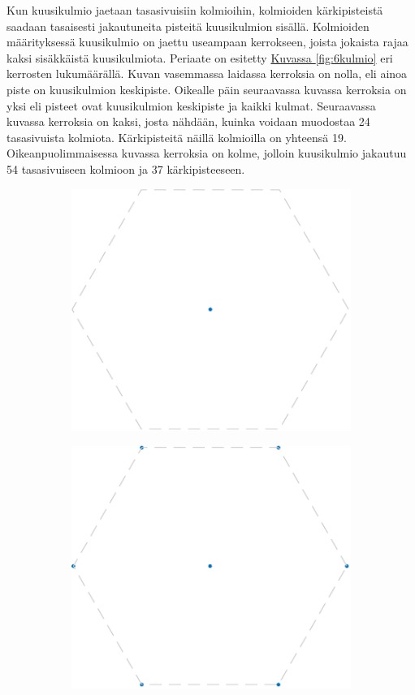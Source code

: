 Kun kuusikulmio jaetaan tasasivuisiin kolmioihin, kolmioiden kärkipisteistä saadaan tasaisesti jakautuneita pisteitä kuusikulmion sisällä. Kolmioiden määrityksessä kuusikulmio on jaettu useampaan kerrokseen, joista jokaista rajaa kaksi sisäkkäistä kuusikulmiota. Periaate on esitetty \hyperref[fig:6kulmio]{Kuvassa \ref*{fig:6kulmio}} eri kerrosten lukumäärällä. Kuvan vasemmassa laidassa kerroksia on nolla, eli ainoa piste on kuusikulmion keskipiste. Oikealle päin seuraavassa kuvassa kerroksia on yksi eli pisteet ovat kuusikulmion keskipiste ja kaikki kulmat. Seuraavassa kuvassa kerroksia on kaksi, josta nähdään, kuinka voidaan muodostaa 24 tasasivuista kolmiota. Kärkipisteitä näillä kolmioilla on yhteensä 19. Oikeanpuolimmaisessa kuvassa kerroksia on kolme, jolloin kuusikulmio jakautuu 54 tasasivuiseen kolmioon ja 37 kärkipisteeseen.
\begin{figure}[H]
    \centering
    \captionsetup{width=.9\textwidth}
    \begin{subfigure}[t]{.225\textwidth}
        \includegraphics[width=.9\linewidth]{kuvat/6kulmio0.pdf}
        \caption{}
    \end{subfigure}%
    \begin{subfigure}[t]{.225\textwidth}
        \includegraphics[width=.9\linewidth]{kuvat/6kulmio1.pdf}

\end{subfigure}
\end{figure}
